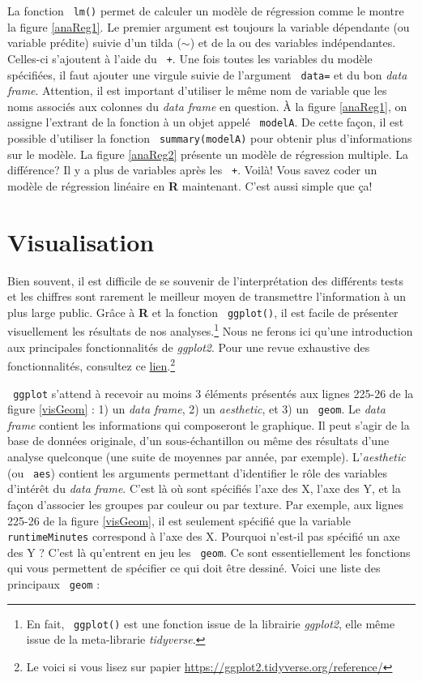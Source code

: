 \documentclass[10.5pt,a4paper]{article}
\newcommand{\rcode}[1]{\texttt{\color{rstudio} #1}}
\begin{document}
  La fonction \rcode{lm()} permet de calculer un modèle de régression comme le montre la figure \ref{anaReg1}. Le premier argument est toujours la variable dépendante (ou variable prédite) suivie d'un tilda ($\sim$) et de la ou des variables indépendantes. Celles-ci s'ajoutent à l'aide du \rcode{+}. Une fois toutes les variables du modèle spécifiées, il faut ajouter une virgule suivie de l'argument \rcode{data=} et du bon \textit{data frame}. Attention, il est important d'utiliser le même nom de variable que les noms associés aux colonnes du \textit{data frame} en question. À la figure \ref{anaReg1}, on assigne l'extrant de la fonction à un objet appelé \rcode{modelA}. De cette façon, il est possible d'utiliser la fonction \rcode{summary(modelA)} pour obtenir plus d'informations sur le modèle. La figure \ref{anaReg2} présente un modèle de régression multiple. La différence? Il y a plus de variables après les \rcode{+}. Voilà! Vous savez coder un modèle de régression linéaire en \textbf{R} maintenant. C'est aussi simple que ça!  
  
  \section{Visualisation}
  Bien souvent, il est difficile de se souvenir de l'interprétation des différents tests et les chiffres sont rarement le meilleur moyen de transmettre l'information à un plus large public. Grâce à \textbf{R} et la fonction \rcode{ggplot()}, il est facile de présenter visuellement les résultats de nos analyses.\footnote{En fait, \rcode{ggplot()} est une fonction issue de la librairie \textit{ggplot2}, elle même issue de la meta-librarie \textit{tidyverse}.} Nous ne ferons ici qu'une introduction aux principales fonctionnalités de \textit{ggplot2}. Pour une revue exhaustive des fonctionnalités, consultez ce \href{https://ggplot2.tidyverse.org/reference/}{lien}.\footnote{Le voici si vous lisez sur papier \href{https://ggplot2.tidyverse.org/reference/}{https://ggplot2.tidyverse.org/reference/}}
  
  \rcode{ggplot} s'attend à recevoir au moins 3 éléments présentés aux lignes 225-26 de la figure \ref{visGeom} : 1) un \emph{data frame}, 2) un \textit{aesthetic}, et 3) un \rcode{geom}. Le \emph{data frame} contient les informations qui composeront le graphique. Il peut s'agir de la base de données originale, d'un sous-échantillon ou même des résultats d'une analyse quelconque (une suite de moyennes par année, par exemple). L'\textit{aesthetic} (ou \rcode{aes}) contient les arguments permettant d'identifier le rôle des variables d'intérêt du \emph{data frame}. C'est là où sont spécifiés l'axe des X, l'axe des Y, et la façon d'associer les groupes par couleur ou par texture. Par exemple, aux lignes 225-26 de la figure \ref{visGeom}, il est seulement spécifié que la variable \rcode{runtimeMinutes} correspond à l'axe des X. Pourquoi n'est-il pas spécifié un axe des Y ? C'est là qu'entrent en jeu les \rcode{geom}. Ce sont essentiellement les fonctions qui vous permettent de spécifier ce qui doit être dessiné. Voici une liste des principaux \rcode{geom} :
  
\end{document}
